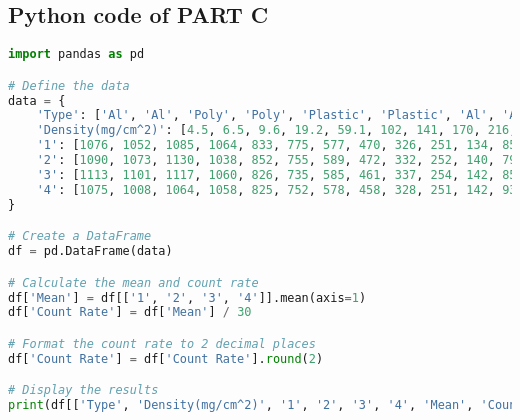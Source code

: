 \documentclass[a4paper,11pt]{article}
\begin{document}
\subsection*{Python code of PART C}
\begin{lstlisting}[language=Python]
import pandas as pd

# Define the data
data = {
    'Type': ['Al', 'Al', 'Poly', 'Poly', 'Plastic', 'Plastic', 'Al', 'Al', 'Al', 'Al', 'Al', 'Al', 'Al', 'Al', 'Al', 'Al', 'Lead', 'Lead', 'Lead', 'Lead'],
    'Density(mg/cm^2)': [4.5, 6.5, 9.6, 19.2, 59.1, 102, 141, 170, 216, 258, 328, 425, 522, 645, 655, 840, 1120, 2066, 3448, 7367],
    '1': [1076, 1052, 1085, 1064, 833, 775, 577, 470, 326, 251, 134, 85, 46, 41, 35, 31, 29, 26, 24, 17],
    '2': [1090, 1073, 1130, 1038, 852, 755, 589, 472, 332, 252, 140, 79, 49, 38, 35, 32, 28, 28, 26, 19],
    '3': [1113, 1101, 1117, 1060, 826, 735, 585, 461, 337, 254, 142, 85, 50, 39, 34, 32, 29, 27, 23, 21],
    '4': [1075, 1008, 1064, 1058, 825, 752, 578, 458, 328, 251, 142, 93, 47, 37, 36, 30, 29, 28, 26, 16]
}

# Create a DataFrame
df = pd.DataFrame(data)

# Calculate the mean and count rate
df['Mean'] = df[['1', '2', '3', '4']].mean(axis=1)
df['Count Rate'] = df['Mean'] / 30

# Format the count rate to 2 decimal places
df['Count Rate'] = df['Count Rate'].round(2)

# Display the results
print(df[['Type', 'Density(mg/cm^2)', '1', '2', '3', '4', 'Mean', 'Count Rate']])
\end{lstlisting}
\end{document}
